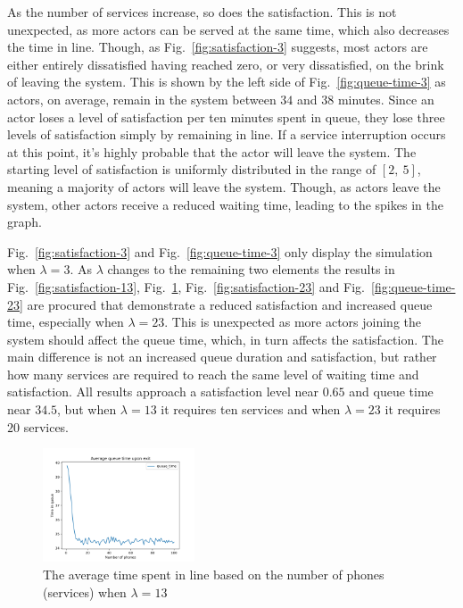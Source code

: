 \documentclass[conference]{IEEEtran}
\begin{document}
As the number of services increase, so does the satisfaction. This
is not unexpected, as more actors can be served at the same time,
which also decreases the time in line. Though, as
Fig.~\ref{fig:satisfaction-3} suggests, most actors are
either entirely dissatisfied having reached zero, or very
dissatisfied, on the brink of leaving the system. This is shown by
the left side of Fig.~\ref{fig:queue-time-3} as actors, on average,
remain in the system between $34$ and $38$ minutes. Since an actor
loses a level of satisfaction per ten minutes spent in queue, they
lose three levels of satisfaction simply by remaining in line. If a
service interruption occurs at this point, it's highly probable
that the actor will leave the system. The starting level of
satisfaction is uniformly distributed in the range of $[2,~5]$,
meaning a majority of actors will leave the system. Though, as
actors leave the system, other actors receive a reduced waiting
time, leading to the spikes in the graph.

Fig.~\ref{fig:satisfaction-3} and Fig.~\ref{fig:queue-time-3} only
display the simulation when $\lambda = 3$. As $\lambda$ changes to
the remaining two elements the results in
Fig.~\ref{fig:satisfaction-13}, Fig.~\ref{fig:queue-time-13},
Fig.~\ref{fig:satisfaction-23} and Fig.~\ref{fig:queue-time-23} are
procured that demonstrate a reduced satisfaction and increased
queue time, especially when $\lambda = 23$. This is unexpected as
more actors joining the system should affect the queue time, which,
in turn affects the satisfaction. The main difference is not an
increased queue duration and satisfaction, but rather how many
services are required to reach the same level of waiting time and
satisfaction. All results approach a satisfaction level near $0.65$
and queue time near $34.5$, but when $\lambda = 13$ it requires
ten services and when $\lambda = 23$ it requires $20$ services.

\begin{figure}[htbp]
    \centerline{
        \includegraphics[width=0.4\textwidth]{
            figures/queue-time-13.png
        }
    }
    \caption{
        The average time spent in line based on the number of
        phones (services) when $\lambda = 13$
    }
    \label{fig:queue-time-13}
\end{figure}
\end{document}
